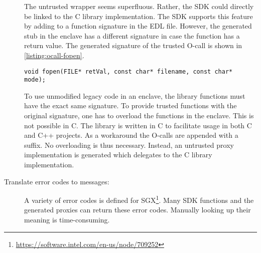 \begin{description}
The untrusted wrapper seems superfluous. Rather, the SDK could directly be linked to the C library implementation.\label{ID_547328155}
The SDK supports this feature by adding  to a function signature in the EDL file.\cite[]{sgx-windows}\label{ID_1497646761}
However, the generated stub in the enclave has a different signature in case the function has a return value. The generated signature of the trusted  O-call is shown in \autoref{listing:ocall-fopen}.\label{ID_446408595}
\begin{lstlisting}[style=cpp, numbers=none, label=listing:ocall-fopen, caption={\textbf{Generated O-call signature for standard C library function.} The SDK passes the return value via a pointer parameter.}]
void fopen(FILE* retVal, const char* filename, const char* mode);
\end{lstlisting}
To use unmodified legacy code in an enclave, the library functions must have the exact same signature.\label{ID_1472270465}
To provide trusted functions with the original signature, one has to overload the functions in the enclave. This is not possible in C. The library is written in C to facilitate usage in both C and C++ projects.\label{ID_104777994}
As a workaround the O-calls are appended with a  suffix. No overloading is thus necessary. Instead, an untrusted proxy implementation is generated which delegates to the C library implementation.\label{ID_1394611332}
\item[Translate error codes to messages:]\label{ID_1725641591}
A variety of error codes is defined for SGX\footnote{\url{https://software.intel.com/en-us/node/709252}}.\label{ID_1308659811}
Many SDK functions and the generated proxies can return these error codes.\label{ID_383627344}
Manually looking up their meaning is time-consuming.\label{ID_1960603292}


\end{description}
